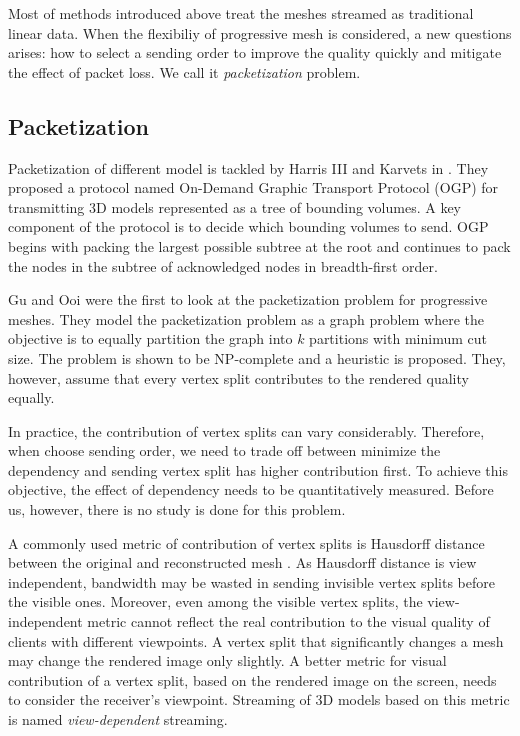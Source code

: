 \documentclass[11pt, a4paper]{report}
\begin{document}
    Most of methods introduced above treat the meshes streamed as 
    traditional linear data. When the flexibiliy of progressive mesh
    is considered, a new questions arises: how to select a sending order
    to improve the quality quickly and mitigate the effect of packet loss.
    We call it \emph{packetization} problem.
    
    \subsection{Packetization}
    \label{ss:intro:packetization}
    Packetization of different model is tackled by
    Harris III and Karvets in \cite{harris:design}.   
    They proposed a protocol named On-Demand Graphic Transport Protocol (OGP)
    for transmitting 3D models represented as a tree of bounding volumes.
    A key component of the protocol is to decide which bounding volumes
    to send.  OGP begins with packing the largest possible subtree at
    the root and continues to pack the nodes in the subtree of
    acknowledged nodes in breadth-first order.  
    
    Gu and Ooi \cite{Gu:Packetization} were the first to look at
    the packetization problem for progressive meshes.  They model
    the packetization problem as a graph problem where the objective
    is to equally partition the graph into $k$ partitions with minimum
    cut size.  The problem is shown to be NP-complete and a heuristic
    is proposed.  They, however, assume that every vertex split contributes 
    to the rendered quality equally.
    
    In practice, the contribution of vertex splits can
    vary considerably. Therefore, when choose sending order, we
    need to trade off between minimize the dependency and sending 
    vertex split has higher contribution first. To achieve this objective,
    the effect of dependency needs to be quantitatively measured.
    Before us, however, there is no study is done for this problem.

    A commonly used metric of contribution of vertex splits is 
    Hausdorff distance between the original and reconstructed mesh \cite{cignoni98metro}.
    As Hausdorff distance is view independent, 
    bandwidth may be wasted in sending invisible vertex splits
    before the visible ones. Moreover, even among the visible vertex splits,
    the view-independent metric cannot reflect the real contribution to the visual quality of
    clients with different viewpoints. A vertex split that significantly
    changes a mesh may change the rendered image 
    only slightly.  A better metric for visual contribution of a vertex split,
    based on the rendered image on the screen, 
    needs to consider the receiver's viewpoint.
    Streaming of 3D models based on this metric is named \emph{view-dependent} streaming.
\end{document}
